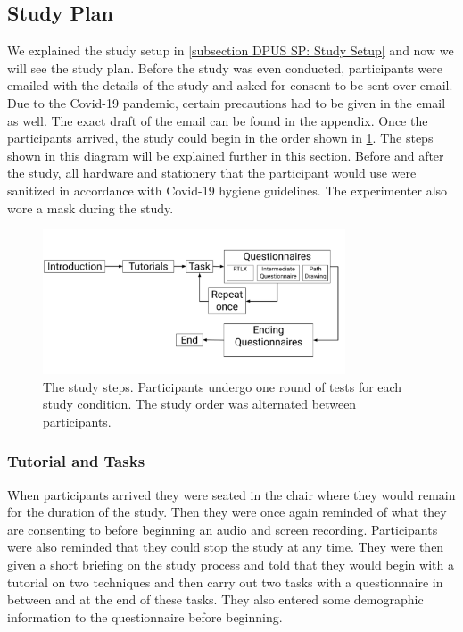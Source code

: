 \subsection{Study Plan}
\label{subsection DPUS SP: Study Plan}
We explained the study setup in \cref{subsection DPUS SP: Study Setup} and now we will see the study plan. Before the study was even conducted, participants were emailed with the details of the study and asked for consent to be sent over email. Due to the Covid-19 pandemic, certain precautions had to be given in the email as well. The exact draft of the email can be found in the appendix. Once the participants arrived, the study could begin in the order shown in \cref{fig:study-plan}. The steps shown in this diagram will be explained further in this section. Before and after the study, all hardware and stationery that the participant would use were sanitized in accordance with Covid-19 hygiene guidelines. The experimenter also wore a mask during the study.

\begin{figure}[]
	\centering
	\includegraphics[width=0.8\textwidth]{images/study-plan.pdf}
	\caption{The study steps. Participants undergo one round of tests for each study condition. The study order was alternated between participants.}
	\label{fig:study-plan}
\end{figure}

\subsubsection{Tutorial and Tasks}
\label{subsubsection DPUS SP SP: Tutorial and Tasks}
When participants arrived they were seated in the chair where they would remain for the duration of the study. Then they were once again reminded of what they are consenting to before beginning an audio and screen recording. Participants were also reminded that they could stop the study at any time. They were then given a short briefing on the study process and told that they would begin with a tutorial on two techniques and then carry out two tasks with a questionnaire in between and at the end of these tasks. They also entered some demographic information to the questionnaire before beginning.


